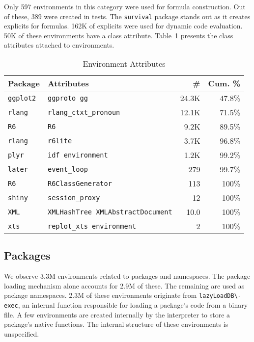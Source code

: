 \documentclass[10pt,review,sigplan,authorversion=true]{acmart}
\renewcommand{\c}[1]{\lstinline |#1|\xspace}
\begin{document}
\noindent
Only 597 environments in this category were used for formula construction. Out
of these, 389 were created in tests. The \c{survival} package stands out as it
creates explicits for formulas. 162K of explicits were used for dynamic code
evaluation. 50K of these environments have a class attribute.
Table~\ref{table:explicit_env_attr} presents the class attributes attached to
environments.

\begin{table}[!h]
  \small
  \caption{Environment Attributes} \label{table:explicit_env_attr}
  \centering
  \begin{tabular}{@{}ll@{}rr@{}}
    \toprule
    \textbf{Package}&\textbf{Attributes}&\textbf{\#}&\textbf{Cum. \%}\\
    \midrule
    \texttt{ggplot2}&\texttt{ggproto gg}&24.3K&47.8\%\\
    \texttt{rlang}&\texttt{rlang\_ctxt\_pronoun}&12.1K&71.5\%\\
    \texttt{R6}&\texttt{R6}&9.2K&89.5\%\\
    \texttt{rlang}&\texttt{r6lite}&3.7K&96.8\%\\
    \texttt{plyr}&\texttt{idf environment}&1.2K&99.2\%\\
    \texttt{later}&\texttt{event\_loop}&279&99.7\%\\
    \texttt{R6}&\texttt{R6ClassGenerator}&113&100\%\\
    \texttt{shiny}&\texttt{session\_proxy}&12&100\%\\
    \texttt{XML}&\texttt{XMLHashTree XMLAbstractDocument}&10.0&100\%\\
    \texttt{xts}&\texttt{replot\_xts environment}&2&100\%\\
    \bottomrule
  \end{tabular}
\end{table}


\subsection{Packages}

We observe 3.3M environments related to packages and namespaces. The package
loading mechanism alone accounts for 2.9M of these. The remaining are used as
package namespaces. 2.3M of these environments originate from
\c{lazyLoadDB\-exec}, an internal function responsible for loading a package's
code from a binary file. A few environments are created internally by the
interpreter to store a package's native functions. The internal structure of
these environments is unspecified.
\end{document}
